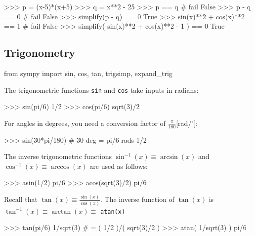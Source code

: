 \small
\begin{verbatimtab}
>>> p = (x-5)*(x+5)
>>> q = x**2 - 25
>>> p == q                                      # fail
False
>>> p - q == 0                                  # fail 
False
>>> simplify(p - q) == 0          
True
>>> sin(x)**2 + cos(x)**2  == 1                 # fail
False
>>> simplify( sin(x)**2 + cos(x)**2 - 1 ) == 0
True
\end{verbatimtab}
\normalsize


\subsection{Trigonometry}
\label{basics:trigonometry}

\small
\begin{verbatimtab}
from sympy import sin, cos, tan, trigsimp, expand_trig
\end{verbatimtab}
\normalsize

\noindent
The trigonometric functions \texttt{sin} and \texttt{cos} take inputs in radians: 



\small
\begin{verbatimtab}
>>> sin(pi/6)
1/2
>>> cos(pi/6)
sqrt(3)/2
\end{verbatimtab}
\normalsize

\noindent
For angles in degrees, 
you need a conversion factor of $\frac{\pi}{180}$[rad/$^\circ$]:

\small
\begin{verbatimtab}
>>> sin(30*pi/180)                 # 30 deg = pi/6 rads 
1/2
\end{verbatimtab}
\normalsize

\noindent
The inverse trigonometric functions $\sin^{-1}(x)\equiv \arcsin(x)$
and $\cos^{-1}(x)\equiv \arccos(x)$ are used as follows:

\small
\begin{verbatimtab}
>>> asin(1/2)
pi/6
>>> acos(sqrt(3)/2)
pi/6
\end{verbatimtab}
\normalsize
Recall that $\tan(x) \equiv \frac{\sin(x)}{\cos(x)}$.
The inverse function of $\tan(x)$ is $\tan^{-1}(x)\equiv \arctan(x)\equiv$ \texttt{atan(x)}



\small
\begin{verbatimtab}
>>> tan(pi/6)
1/sqrt(3)                          # = ( 1/2 )/( sqrt(3)/2 )
>>> atan( 1/sqrt(3) )
pi/6
\end{verbatimtab}
\normalsize

